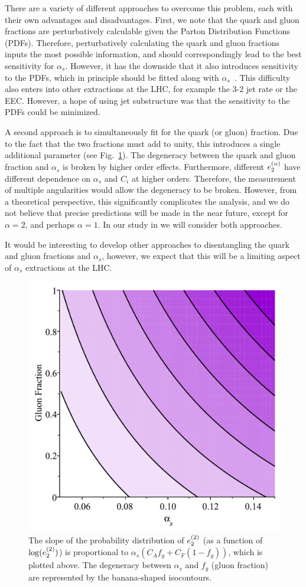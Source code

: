 There are a variety of different approaches to overcome this problem, each with their own advantages and disadvantages. First, we note that the quark and gluon fractions are perturbatively calculable given the Parton Distribution Functions (PDFs). Therefore, perturbatively calculating the quark and gluon fractions inputs the most possible information, and should correspondingly lead to the best sensitivity for $\alpha_s$. However, it has the downside that it also introduces sensitivity to the PDFs, which in principle should be fitted along with $\alpha_s$~\cite{Accardi:2016ndt}. This difficulty also enters into other extractions at the LHC, for example the $3$-$2$ jet rate or the EEC. However, a hope of using jet substructure was that the sensitivity to the PDFs could be minimized.

A second approach is to simultaneously fit for the quark (or gluon) fraction. Due to the fact that the two fractions must add to unity, this introduces a single additional parameter (see Fig.~\ref{fig:analyticbanana}). The degeneracy between the quark and gluon fraction and $\alpha_s$ is broken by higher order effects. Furthermore, different $e_{2}^{(\alpha)}$ have different dependence on $\alpha_s$ and $C_i$ at higher orders. Therefore, the measurement of multiple angularities would allow the degeneracy to be broken. However, from a theoretical perspective, this significantly complicates the analysis, and we do not believe that precise predictions will be made in the near future, except for $\alpha=2$, and perhaps $\alpha=1$. In our study in  we will consider both approaches.

It would be interesting to develop other approaches to disentangling the quark and gluon fractions and $\alpha_s$, however, we expect that this will be a limiting aspect of $\alpha_s$ extractions at the LHC.


\begin{figure}[h!]
\begin{center}
\includegraphics[width = 0.4\columnwidth]{figures/Degeneracy}
\end{center}
\caption{The slope of the probability distribution of $e_{2}^{(2)}$ (as a function of $\log(e_{2}^{(2)})$) is proportional to $\alpha_s(C_Af_g+C_F(1-f_g))$, which is plotted above.  The degeneracy between $\alpha_s$ and $f_g$ (gluon fraction) are represented by the banana-shaped isocontours. }
\label{fig:analyticbanana}
\end{figure}


